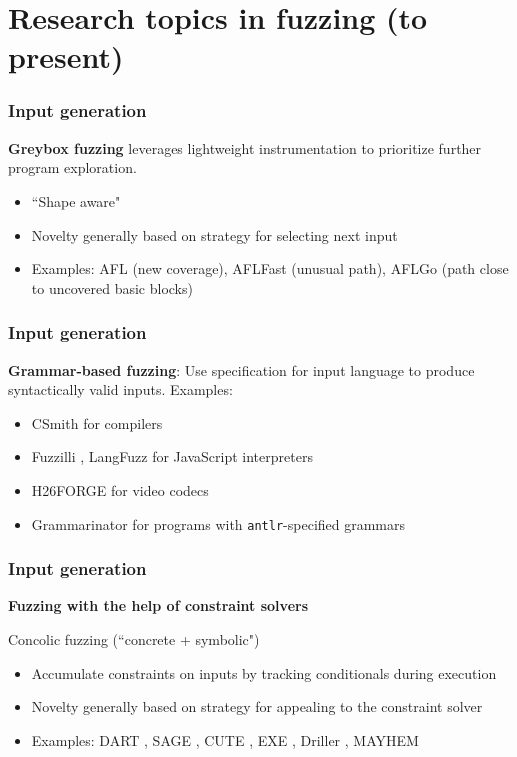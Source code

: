\documentclass{beamer}
\begin{document}
\begin{frame}
\end{frame}

\section[Research topics]{Research topics in fuzzing \normalsize{(to present)}}

\begin{frame}
	\frametitle{Input generation}
	\textbf{Greybox fuzzing} leverages lightweight instrumentation to prioritize further program exploration. \begin{itemize}
		\item{``Shape aware"}
		\item{Novelty generally based on strategy for selecting next input}
		\item{Examples: AFL (new coverage), AFLFast \cite{aflfast} (unusual path), AFLGo \cite{aflgo} (path close to uncovered basic blocks)}
	\end{itemize}
\end{frame}

\begin{frame}
	\frametitle{Input generation}

	\textbf{Grammar-based fuzzing}: Use specification for input language to produce syntactically valid inputs. Examples: \begin{itemize}
		\item{CSmith \cite{csmith} for compilers}
		\item{Fuzzilli \cite{fuzzilli}, LangFuzz \cite{langfuzz} for JavaScript interpreters}
		\item{H26FORGE \cite{h26forge} for video codecs}
		\item{Grammarinator \cite{grammarinator} for programs with \texttt{antlr}-specified grammars}
	\end{itemize}

\end{frame}

\begin{frame}
	\frametitle{Input generation}
	\textbf{Fuzzing with the help of constraint solvers} 

	\vspace{\baselineskip}
	Concolic fuzzing (``concrete + symbolic")
	\begin{itemize}
		\item{Accumulate constraints on inputs by tracking conditionals during execution}
		\item{Novelty generally based on strategy for appealing to the constraint solver}
		\item{Examples: DART \cite{dart}, SAGE \cite{sage}, CUTE \cite{cute}, EXE \cite{exe}, Driller \cite{driller}, MAYHEM \cite{mayhem}}

	\end{itemize}


\end{frame}
\end{document}
